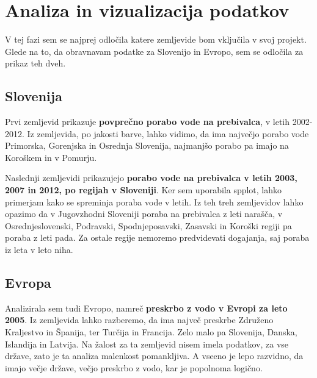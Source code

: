 \documentclass[11pt,a4paper]{article}
\begin{document}


\section{Analiza in vizualizacija podatkov}

V tej fazi sem se najprej odločila katere zemljevide bom vključila v svoj projekt. Glede na to, da obravnavam podatke za Slovenijo in Evropo, sem se odločila za prikaz teh dveh.
\vspace{5mm} 

\subsection{Slovenija}
Prvi zemljevid prikazuje \textbf{povprečno porabo vode na prebivalca}, v letih 2002-2012. Iz zemljevida, po jakosti barve, lahko vidimo, da ima največjo porabo vode Primorska, Gorenjska in Osrednja Slovenija, najmanjšo porabo pa imajo na Koroškem in v Pomurju.


\newpage
Naslednji zemljevidi prikazujejo \textbf{porabo vode na prebivalca v letih 2003, 2007 in 2012, po regijah v Sloveniji}. Ker sem uporabila spplot, lahko primerjam kako se spreminja poraba vode v letih. Iz teh treh zemljevidov lahko opazimo da v Jugovzhodni Sloveniji poraba na prebivalca z leti narašča, v Osrednjeslovenski, Podravski, Spodnjeposavski, Zasavski in Koroški regiji pa poraba z leti pada. Za ostale regije nemoremo predvidevati dogajanja, saj poraba iz leta v leto niha. 



\newpage
\subsection{Evropa}
Analizirala sem tudi Evropo, namreč \textbf{preskrbo z vodo v Evropi za leto 2005}. Iz zemljevida lahko razberemo, da ima največ preskrbe Združeno Kraljestvo in Španija, ter Turčija in Francija. Zelo malo pa Slovenija, Danska, Islandija in Latvija. Na žalost za ta zemljevid nisem imela podatkov, za vse države, zato je ta analiza malenkost pomankljiva. A vseeno je lepo razvidno, da imajo večje države, večjo preskrbo z vodo, kar je popolnoma logično.
\end{document}
